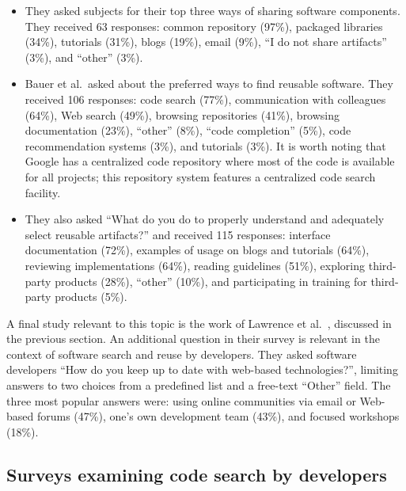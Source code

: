 \documentclass{casicswhitepaper}
\begin{document}
\begin{itemize}

\item They asked subjects for their top three ways of sharing software components.  They received 63 responses: common repository (97\%), packaged libraries (34\%), tutorials (31\%), blogs (19\%), email (9\%), ``I do not share artifacts'' (3\%), and ``other'' (3\%).

\item Bauer et al.\ asked about the preferred ways to find reusable software.  They received 106 responses: code search (77\%), communication with colleagues (64\%), Web search (49\%), browsing repositories (41\%), browsing documentation (23\%), ``other'' (8\%), ``code completion'' (5\%), code recommendation systems (3\%), and tutorials (3\%).  It is worth noting that Google has a centralized code repository where most of the code is available for all projects; this repository system features a centralized code search facility.

\item They also asked ``What do you do to properly understand and adequately select reusable artifacts?'' and received 115 responses: interface documentation (72\%), examples of usage on blogs and tutorials (64\%), reviewing implementations (64\%), reading guidelines (51\%), exploring third-party products (28\%), ``other'' (10\%), and participating in training for third-party products (5\%).

\end{itemize}

A final study relevant to this topic is the work of Lawrence et al.~\cite{lawrence2015science, lawrence2014who}, discussed in the previous section.  An additional question in their survey is relevant in the context of software search and reuse by developers.  They asked software developers ``How do you keep up to date with web-based technologies?'', limiting answers to two choices from a predefined list and a free-text ``Other'' field.  The three most popular answers were: using online communities via email or Web-based forums (47\%), one's own development team (43\%), and focused workshops (18\%).


\subsection{Surveys examining code search by developers}
\label{code-search-by-developers}
\end{document}

